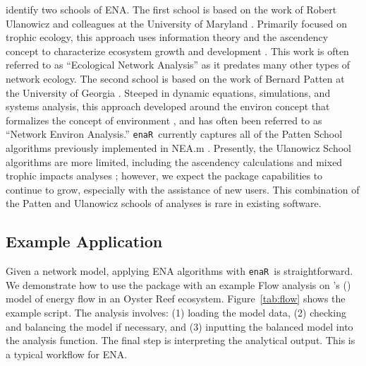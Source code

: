 \documentclass[11pt]{article}
\def\citeapos#1{\citeauthor{#1}'s (\citeyear{#1})}
\newcommand{\enaR}{\texttt{enaR}}
\begin{document}
\begin{spacing}{2}
\citet{scharler09comparing} identify two schools of ENA.  The first
school is based on the work of Robert Ulanowicz and colleagues at the
University of Maryland \citep{ulanowicz86, ulanowicz97,
  ulanowicz09_window}.  Primarily focused on trophic ecology, this
approach uses information theory and the ascendency concept to
characterize ecosystem growth and development \citep{ulanowicz86,
  ulanowicz97}.  This work is often referred to as ``Ecological
Network Analysis'' as it predates many other types of network ecology.
The second school is based on the work of Bernard Patten at the
University of Georgia \citep{patten76, matis81, patten82,
  fath99_review}.  Steeped in dynamic equations, simulations, and
systems analysis, this approach developed around the environ concept
that formalizes the concept of environment \citep{patten78}, and has
often been referred to as ``Network Environ Analysis.''  \enaR\
currently captures all of the Patten School algorithms previously
implemented in NEA.m \citep{fath06}.  Presently, the Ulanowicz School
algorithms are more limited, including the ascendency calculations
\citep{ulanowicz97} and mixed trophic impacts analyses
\citep{ulanowicz90}; however, we expect the package capabilities to
continue to grow, especially with the assistance of new users.  This
combination of the Patten and Ulanowicz schools of analyses is rare in
existing software.

\subsection{Example Application}
Given a network model, applying ENA algorithms with \enaR\ is
straightforward. We demonstrate how to use the package with an example
Flow analysis on \citeapos{dame81} model of energy flow in an Oyster
Reef ecosystem. Figure~\ref{tab:flow} shows the example script.  The
analysis involves: (1) loading the model data, (2) checking and
balancing the model if necessary, and (3) inputting the balanced model
into the analysis function.  The final step is interpreting the
analytical output. This is a typical workflow for ENA.


\end{spacing}
\end{document}
